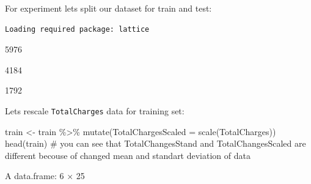 \documentclass[
  letterpaper,
  DIV=11,
  numbers=noendperiod]{scrreprt}
\newenvironment{Shaded}{\begin{snugshade}}{\end{snugshade}}
\newcommand{\AttributeTok}[1]{\textcolor[rgb]{0.40,0.45,0.13}{#1}}
\newcommand{\CommentTok}[1]{\textcolor[rgb]{0.37,0.37,0.37}{#1}}
\newcommand{\ConstantTok}[1]{\textcolor[rgb]{0.56,0.35,0.01}{#1}}
\newcommand{\DecValTok}[1]{\textcolor[rgb]{0.68,0.00,0.00}{#1}}
\newcommand{\FloatTok}[1]{\textcolor[rgb]{0.68,0.00,0.00}{#1}}
\newcommand{\FunctionTok}[1]{\textcolor[rgb]{0.28,0.35,0.67}{#1}}
\newcommand{\NormalTok}[1]{\textcolor[rgb]{0.00,0.23,0.31}{#1}}
\newcommand{\OtherTok}[1]{\textcolor[rgb]{0.00,0.23,0.31}{#1}}
\newcommand{\SpecialCharTok}[1]{\textcolor[rgb]{0.37,0.37,0.37}{#1}}
\begin{document}
For experiment lets split our dataset for train and test:

\begin{Shaded}
\end{Shaded}

\begin{verbatim}
Loading required package: lattice
\end{verbatim}

5976

4184

1792

Lets rescale \texttt{TotalCharges} data for training set:

\begin{Shaded}
\begin{Highlighting}[]
\NormalTok{train }\OtherTok{\textless{}{-}}\NormalTok{ train }\SpecialCharTok{\%\textgreater{}\%} \FunctionTok{mutate}\NormalTok{(}\AttributeTok{TotalChargesScaled =} \FunctionTok{scale}\NormalTok{(TotalCharges))}
\FunctionTok{head}\NormalTok{(train) }\CommentTok{\# you can see that TotalChangesStand and TotalChangesScaled are different becouse of changed mean and standart deviation of data}
\end{Highlighting}
\end{Shaded}

A data.frame: 6 × 25
\end{document}
